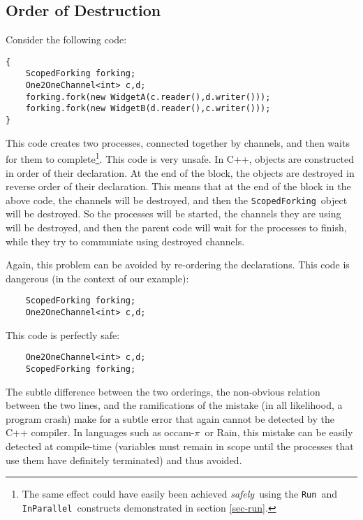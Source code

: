 \documentclass[12pt]{IOS-Book-Article-CPA-2007}
\newcommand{\occampi}{occam-$\pi$}
\newcommand{\code}[1]{{\small\texttt{#1}}}
\begin{document}
\subsection{Order of Destruction}

Consider the following code:

{\small\begin{verbatim}
{
    ScopedForking forking;
    One2OneChannel<int> c,d;    
    forking.fork(new WidgetA(c.reader(),d.writer()));
    forking.fork(new WidgetB(d.reader(),c.writer()));
}
\end{verbatim}}

This code creates two processes, connected together by channels, and then waits for them to complete\footnote{The same effect could have easily been 
achieved \textit{safely}~using the \code{Run}~and \code{InParallel}~constructs demonstrated in section \ref{sec-run}.}.  
This code is very unsafe.  In C++, objects are constructed in order of their declaration.  At the end of the block, the objects are destroyed 
in reverse order of their declaration.  This means that at the end of the block in the above code, the channels will be destroyed, and then the 
\code{ScopedForking}~object will be destroyed.  So the processes will be started, the channels they are using will be destroyed, and then the parent 
code will wait for the processes to finish, while they try to communiate using destroyed channels.

Again, this problem can be avoided by re-ordering the declarations.  This code is dangerous (in the context of our example):

{\small\begin{verbatim}
    ScopedForking forking;
    One2OneChannel<int> c,d;
\end{verbatim}}

This code is perfectly safe:

{\small\begin{verbatim}
    One2OneChannel<int> c,d;
    ScopedForking forking;
\end{verbatim}}

The subtle difference between the two orderings, the non-obvious relation between the two lines, and the ramifications of the mistake (in all 
likelihood, a 
program crash) make for a subtle error that again cannot be detected by the C++ compiler.  In languages such as \occampi~or Rain, this mistake can be easily 
detected at compile-time (variables must remain in scope until the processes that use them have definitely terminated) and thus avoided.
\end{document}
